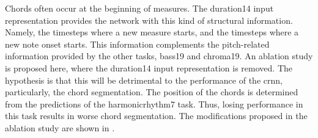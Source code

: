 
Chords often occur at the beginning of measures. The
\gls{duration14} input representation provides the network
with this kind of structural information. Namely, the
timesteps where a new measure starts, and the timesteps
where a new note onset starts. This information complements
the pitch-related information provided by the other tasks,
\gls{bass19} and \gls{chroma19}. An ablation study is
proposed here, where the \gls{duration14} input
representation is removed. The hypothesis is that this will
be detrimental to the performance of the \gls{crnn},
particularly, the chord segmentation. The position of the
chords is determined from the predictions of the
\gls{harmonicrhythm7} task. Thus, losing performance in this
task results in worse chord segmentation. The modifications
proposed in the ablation study are shown in
.

